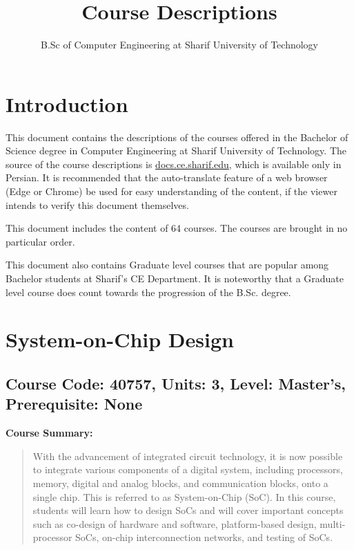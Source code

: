 \documentclass[12pt]{article}
\title{\vspace{3cm} Course Descriptions}
\author{B.Sc of Computer Engineering at Sharif University of Technology}
\date{\vspace{-3ex}}
\begin{document}
\maketitle

\section*{Introduction}
This document contains the descriptions of the courses offered in the Bachelor of Science degree in Computer Engineering at Sharif University of Technology. The source of the course descriptions is \href{https://docs.ce.sharif.edu}{docs.ce.sharif.edu}, which is available only in Persian. It is recommended that the auto-translate feature of a web browser (Edge or Chrome) be used for easy understanding of the content, if the viewer intends to verify this document themselves.

\noindent This document includes the content of 64 courses. The courses are brought in no particular order.

\noindent This document also contains Graduate level courses that are popular among Bachelor students at Sharif's CE Department. It is noteworthy that a Graduate level course does count towards the progression of the B.Sc. degree.
\newpage
\tableofcontents

\newpage




\section{System-on-Chip Design}
\subsection*{Course Code: 40757, Units: 3, Level: Master's, Prerequisite: None}

\textbf{Course Summary:} 
\begin{quote}
   With the advancement of integrated circuit technology, it is now possible to integrate various components of a digital system, including processors, memory, digital and analog blocks, and communication blocks, onto a single chip. This is referred to as System-on-Chip (SoC). In this course, students will learn how to design SoCs and will cover important concepts such as co-design of hardware and software, platform-based design, multi-processor SoCs, on-chip interconnection networks, and testing of SoCs.
\end{quote}
\end{document}
